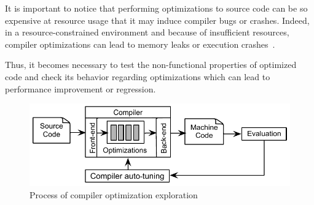 It is important to notice that performing optimizations to source code can be so expensive at resource usage that it may induce compiler bugs or crashes. 
Indeed, in a resource-constrained environment and because of insufficient resources, compiler optimizations can lead to memory leaks or execution crashes~\cite{yang2011finding}. 

Thus, it becomes necessary to test the non-functional properties of optimized code and check its behavior regarding optimizations which can lead to performance improvement or regression.



\begin{figure}[h]
	\centering
	\includegraphics[width=0.9\linewidth]{chapitre3/fig/autotuning.pdf}
	\caption{Process of compiler optimization exploration}
	
\end{figure}

